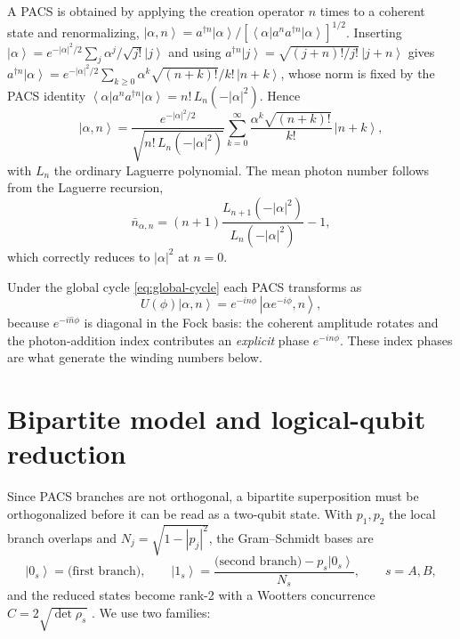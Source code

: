 \documentclass[11pt]{article}
\newcommand{\ket}[1]{\left|#1\right\rangle}
\newcommand{\bra}[1]{\left\langle#1\right|}
\newcommand{\nop}{\hat n}
\begin{document}
A PACS is obtained by applying the creation operator $n$ times to a coherent
state and renormalizing,
$\ket{\alpha,n}=a^{\dagger n}\ket{\alpha}/[\bra{\alpha}a^na^{\dagger n}\ket{\alpha}]^{1/2}$.
Inserting $\ket{\alpha}=e^{-|\alpha|^2/2}\sum_j\alpha^j/\sqrt{j!}\ket{j}$ and
using $a^{\dagger n}\ket{j}=\sqrt{(j+n)!/j!}\,\ket{j+n}$ gives
$a^{\dagger n}\ket{\alpha}=e^{-|\alpha|^2/2}\sum_{k\ge0}\alpha^k\sqrt{(n+k)!}/k!\,\ket{n+k}$,
whose norm is fixed by the PACS identity
$\bra{\alpha}a^na^{\dagger n}\ket{\alpha}=n!\,L_n(-|\alpha|^2)$. Hence
\begin{equation}
\ket{\alpha,n}=\frac{e^{-|\alpha|^2/2}}{\sqrt{n!\,L_n(-|\alpha|^2)}}
\sum_{k=0}^{\infty}\frac{\alpha^{k}\sqrt{(n+k)!}}{k!}\,\ket{n+k},
\label{eq:pacs-fock}
\end{equation}
with $L_n$ the ordinary Laguerre polynomial. The mean photon number follows
from the Laguerre recursion,
\begin{equation}
\bar n_{\alpha,n}=(n+1)\frac{L_{n+1}(-|\alpha|^2)}{L_n(-|\alpha|^2)}-1 ,
\label{eq:nbar}
\end{equation}
which correctly reduces to $|\alpha|^2$ at $n=0$.

Under the global cycle \eqref{eq:global-cycle} each PACS transforms as
\begin{equation}
U(\phi)\ket{\alpha,n}=e^{-in\phi}\,\ket{\alpha e^{-i\phi},n} ,
\label{eq:pacs-evolution}
\end{equation}
because $e^{-i\nop\phi}$ is diagonal in the Fock basis: the coherent amplitude
rotates and the photon-addition index contributes an \emph{explicit} phase
$e^{-in\phi}$. These index phases are what generate the winding numbers below.

\section{Bipartite model and logical-qubit reduction}
\label{sec:model}

Since PACS branches are not orthogonal, a bipartite superposition must be
orthogonalized before it can be read as a two-qubit state. With
$p_1,p_2$ the local branch overlaps and $N_j=\sqrt{1-|p_j|^2}$, the
Gram--Schmidt bases are
\begin{equation}
\ket{0_s}=\text{(first branch)},\qquad
\ket{1_s}=\frac{\text{(second branch)}-p_s\ket{0_s}}{N_s},\qquad s=A,B ,
\label{eq:gram-schmidt}
\end{equation}
and the reduced states become rank-2 with a Wootters concurrence
$C=2\sqrt{\det\rho_s}$ \cite{Wootters1998}. We use two families:
\end{document}
